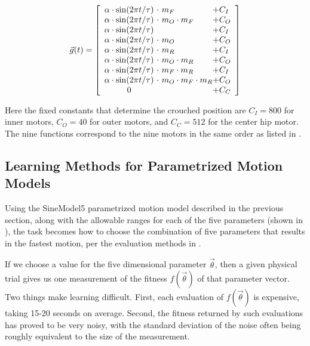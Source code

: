\[
\vec{g}(t) =
\left[ {\begin{array}{c@{ }l@{ }l}
\amp \cdot \sin(2\pi t / \tau) & \ \cdot \           m_F            & + C_I \\ %
\amp \cdot \sin(2\pi t / \tau) & \ \cdot \ m_O \cdot m_F            & + C_O \\ %
\amp \cdot \sin(2\pi t / \tau) & \                                  & + C_I \\ %
\amp \cdot \sin(2\pi t / \tau) & \ \cdot \ m_O                      & + C_O \\ %
\amp \cdot \sin(2\pi t / \tau) & \ \cdot \                     m_R  & + C_I \\ %
\amp \cdot \sin(2\pi t / \tau) & \ \cdot \ m_O           \cdot m_R  & + C_O \\ %
\amp \cdot \sin(2\pi t / \tau) & \ \cdot \           m_F \cdot m_R  & + C_I \\ %
\amp \cdot \sin(2\pi t / \tau) & \ \cdot \ m_O \cdot m_F \cdot m_R  & + C_O \\ %
0                              & \                                  & + C_C \\ %
\end{array} } \right]
\]

\noindent Here the fixed constants that determine the crouched
position are $C_I = 800$ for inner motors, $C_O = 40$ for outer
motors, and $C_C = 512$ for the center hip motor.  The nine functions
correspond to the nine motors in the same order as listed in
.




\subsection{Learning Methods for Parametrized Motion Models}

Using the SineModel5 parametrized motion model described in the
previous section, along with the allowable ranges for each of the five
parameters (shown in ), the task becomes how to
choose the combination of five parameters that results in the fastest
motion, per the evaluation methods in .

If we choose a value for the five dimensional parameter
$\vec{\theta}$, then a given physical trial gives us one measurement
of the fitness $f(\vec{\theta})$ of that parameter vector.  Two
things make learning difficult.  First, each evaluation of
$f(\vec{\theta})$ is expensive, taking 15-20 seconds on
average.  Second, the fitness returned by such evaluations has proved
to be very noisy, with the standard deviation of the noise often being
roughly equivalent to the size of the measurement.

